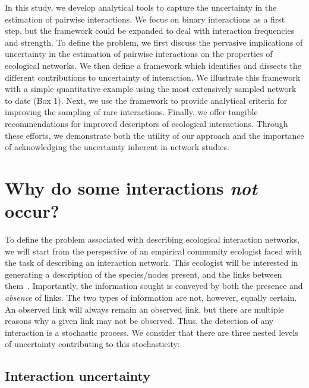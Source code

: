 \documentclass[12pt]{article}
\begin{document}


    In this study, we develop analytical tools to capture the uncertainty in the estimation of pairwise interactions. We focus on binary interactions as a first step, but the framework could be expanded to deal with interaction frequencies and strength. To define the problem, we first discuss the pervasive implications of uncertainty in the estimation of pairwise interactions on the properties of ecological networks. We then define a framework which identifies and dissects the different contributions to uncertainty of interaction. We illustrate this framework with a simple quantitative example using the most extensively sampled network to date (Box 1). Next, we use the framework to provide analytical criteria for improving the sampling of rare interactions. Finally, we offer tangible recommendations for improved descriptors of ecological interactions. Through these efforts, we demonstrate both the utility of our approach and the importance of acknowledging the uncertainty inherent in network studies.


\section*{Why do some interactions \emph{not} occur?}

  To define the problem associated with describing ecological interaction networks, we will start from the perspective of an empirical community ecologist faced with the task of describing an interaction network. This ecologist will be interested in generating a description of the species/nodes present, and the links between them~\citep{Roslin2016}.  Importantly, the information sought is conveyed by both the presence and \emph{absence} of links. The two types of information are not, however, equally certain. An observed link will always remain an observed link, but there are multiple reasons why a given link may not be observed. Thus, the detection of any interaction is a stochastic process. We consider that there are three nested levels of uncertainty contributing to this stochasticity:

    \subsection*{Interaction uncertainty} 
\end{document}
